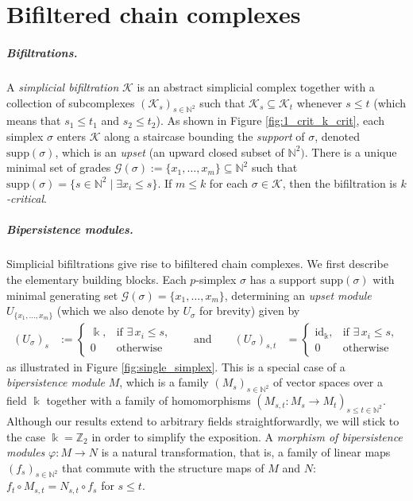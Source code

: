 \documentclass[a4paper,UKenglish,cleveref,nolineno,autoref]{socg-lipics-v2021}
\newcommand{\define}[1]{\emph{#1}} %
\newcommand{\field}{\Bbbk}
\begin{document}
\section{Bifiltered chain complexes}
\label{sec:Background}

\subparagraph{Bifiltrations.} A \define{simplicial bifiltration} $\mathcal{K}$ is an abstract simplicial complex together with a collection of subcomplexes $(\mathcal{K}_s)_{s\in \mathbb{N}^2}$ such that $\mathcal{K}_s\subseteq \mathcal{K}_t$ whenever $s\leq t$ (which means that $s_1\leq t_1$ and $s_2\leq t_2$).
As shown in Figure \ref{fig:1_crit_k_crit}, each simplex $\sigma$ enters $\mathcal{K}$ along a staircase bounding the \define{support} of $\sigma$, denoted $\mathrm{supp}(\sigma)$, which is an \define{upset} (an upward closed subset of $\mathbb{N}^2)$.
There is a unique minimal set of grades
$\mathcal{G}(\sigma):=\{x_1,\dots,x_m\}\subseteq \mathbb{N}^2$ 
such that $\mathrm{supp}(\sigma)=\{ s\in \mathbb{N}^2\mid \exists x_i\leq s\}$.
If $m\leq k$ for each $\sigma \in \mathcal{K}$, then the bifiltration is \define{$k$-critical}. 


\subparagraph{Bipersistence modules.}

Simplicial bifiltrations give rise to bifiltered chain complexes. 
We first describe the elementary building blocks.
Each $p$-simplex $\sigma$ has a support $\mathrm{supp}(\sigma)$ with minimal generating set $\mathcal{G}(\sigma)=\{x_1,\dots,x_m\}$,
determining an \define{upset module} $U_{\{x_1,\dots,x_m\}}$ (which we also denote by $U_\sigma$ for brevity) given by 
\begin{equation*}
\begin{aligned}
(U_\sigma)_s &:= 
\begin{cases}
\field, & \text{if } \exists\, x_i \leq s, \\[6pt]
0 & \text{otherwise}
\end{cases}
&
\quad \text{and}\qquad
(U_\sigma)_{s, t} &= 
\begin{cases}
\mathrm{id}_\field, & \text{if } \exists\, x_i \leq s, \\[6pt]
0 & \text{otherwise}
\end{cases}
\end{aligned}
\end{equation*}
as illustrated in Figure \ref{fig:single_simplex}.
%
This is a special case of a \define{bipersistence module} $M$, which is a family $(M_s)_{s\in\mathbb{N}^2}$ of vector spaces over a field $\field$ together with a family of homomorphisms $(M_{s,t}\colon M_s \rightarrow M_t)_{s\leq t\in \mathbb{N}^2}$.
Although our results extend to arbitrary fields straightforwardly, we will stick to the case $\field=\mathbb{Z}_2$ in order to simplify the exposition.
A \define{morphism of bipersistence modules} $\varphi:M\rightarrow N$ is a natural transformation, that is, a family of linear maps $(f_s)_{s\in \mathbb{N}^2}$ that commute with the structure maps of $M$ and $N$: $f_t \circ M_{s,t} = N_{s,t}\circ f_s$ for $s\leq t$. 
\end{document}
